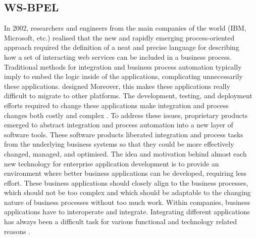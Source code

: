 \subsection {WS-BPEL}
In 2002, researchers and engineers from the main companies of the world (IBM, Microsoft, etc.)
realised that the new and rapidly emerging process-oriented approach required the definition of 
a neat and precise language for describing how a set of interacting web services can be included
in a business process. Traditional methods for integration and business process automation 
typically imply to embed the logic inside of the applications, complicating unnecessarily these applications. designed 
Moreover, this makes these applications really difficult to migrate to other platforms. 
The development, testing, and deployment efforts required 
to change these applications make integration and process changes both costly and complex \cite{bpelsoftcare}.
To address these issues, proprietary products emerged 
to abstract integration and process automation into a new layer of software tools. 
These software products liberated integration and process tasks from 
the underlying business systems so that they could be more effectively changed, managed, and optimised.
The idea and motivation behind almost each new technology for
enterprise application development is to provide an environment where better
business applications can be developed, requiring less effort. These business applications
should closely align to the business processes, which should not be too complex and
which should be adaptable to the changing nature of business processes without too much
work. Within companies, business applications have to
interoperate and integrate. Integrating different
applications has always been a difficult task for various functional and technology
related reasons \cite{}.

